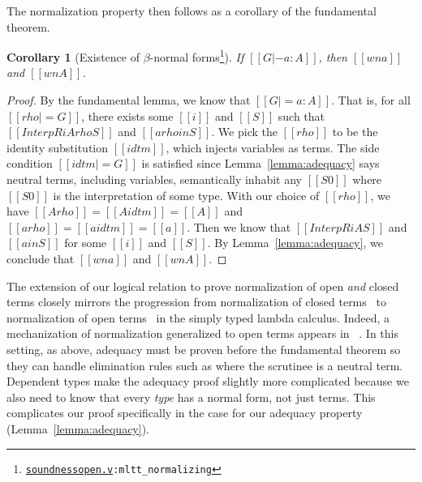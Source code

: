 \documentclass[\ifpublic nolinenum\else\fi,online,OA]{jfp}
\newcommand{\dotv}[2]{\href{#1}{\texttt{#1}}{\texttt{:#2}}}
\newtheorem{corollary}[theorem]{Corollary}
\theoremstyle{definition}
\begin{document}
The normalization property then follows as a corollary of the
fundamental theorem.
\begin{corollary}[Existence of $\beta$-normal forms\footnote{\dotv{soundnessopen.v}{mltt\_normalizing}}]
  \label{corollary:exbetanf}
  If $[[G |- a : A]]$, then $[[wn a]]$ and $[[wn A]]$.
\end{corollary}
\begin{proof}
  By the fundamental lemma, we know that $[[G |= a : A]]$. That is,
  for all $[[rho |= G]]$, there exists some $[[i]]$ and $[[S]]$ such
  that $[[InterpR i A {rho} S]]$ and $[[a {rho} in S]]$.
  We pick the $[[rho]]$ to be the identity substitution $[[idtm]]$, which injects
  variables as terms. The side condition $[[idtm |=
  G]]$ is satisfied since Lemma~\ref{lemma:adequacy} says neutral terms,
  including variables, semantically inhabit any $[[S0]]$ where
  $[[S0]]$ is the interpretation of some type. With our choice of
  $[[rho]]$, we have $[[A {rho}]] = [[A {idtm}]] = [[A]]$ and $[[a {rho}]] = [[a{idtm}]] = [[a]]$. Then we
  know that $[[InterpR i A S]]$ and $[[a in S]]$ for some $[[i]]$ and
  $[[S]]$. By Lemma~\ref{lemma:adequacy}, we
  conclude that $[[wn a]]$ and $[[wn A]]$.
\end{proof}


The extension of our logical relation to prove normalization of open
\emph{and} closed terms closely mirrors the progression from
normalization of closed terms~\citep{harpertait} to normalization of
open terms~\citep{harperkripke} in the simply typed lambda calculus.
Indeed, a mechanization of normalization generalized to open terms
appears in ~\citet{abel2019poplmark}.  In this setting, as above,
adequacy must be proven before the
fundamental theorem so they can handle elimination rules such as
 where the scrutinee is a neutral term. %
%
Dependent types make the adequacy proof slightly more complicated because we
also need to know that every \emph{type} has a normal form, not just
terms. This complicates our proof specifically in the  case for
our adequacy property (Lemma~\ref{lemma:adequacy}).
\end{document}
